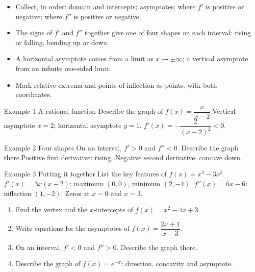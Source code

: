 \documentclass[11pt]{article}
\begin{document}

\begin{ideabox}
\begin{itemize}[leftmargin=*,itemsep=2pt,topsep=2pt]
  \item Collect, in order: domain and intercepts; asymptotes; where $f'$ is positive or negative; where $f''$ is positive or negative.
  \item The signs of $f'$ and $f''$ together give one of four shapes on each interval: rising or falling, bending up or down.
  \item A horizontal asymptote comes from a limit as $x\to\pm\infty$; a vertical asymptote from an infinite one-sided limit.
  \item Mark relative extrema and points of inflection as points, with both coordinates.
\end{itemize}
\end{ideabox}

\begin{example}{Example 1 \textperiodcentered{} A rational function}
Describe the graph of $f(x)=\dfrac{x}{x-2}$.\soln Vertical asymptote $x=2$; horizontal asymptote $y=1$. $f'(x)=-\dfrac{2}{(x-2)^2}<0$.
\end{example}

\begin{example}{Example 2 \textperiodcentered{} Four shapes}
On an interval, $f'>0$ and $f''<0$. Describe the graph there.\soln Positive first derivative: rising. Negative second derivative: concave down.
\end{example}

\begin{example}{Example 3 \textperiodcentered{} Putting it together}
List the key features of $f(x)=x^3-3x^2$.\soln $f'(x)=3x(x-2)$: maximum $(0,0)$, minimum $(2,-4)$. $f''(x)=6x-6$: inflection $(1,-2)$. Zeros at $x=0$ and $x=3$.
\end{example}

\newpage
{}

\begin{enumerate}[leftmargin=*,itemsep=2pt]
  \item Find the vertex and the $x$-intercepts of $f(x)=x^2-4x+3$.\work{2.3cm}
  \item Write equations for the asymptotes of $f(x)=\dfrac{2x+1}{x-3}$.\work{2.3cm}
  \item On an interval, $f'<0$ and $f''>0$. Describe the graph there.\work{2.3cm}
  \item Describe the graph of $f(x)=e^{-x}$: direction, concavity and asymptote.\work{2.3cm}
\end{enumerate}
\end{document}
